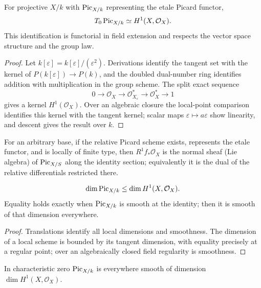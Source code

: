 \begin{theorem}\label{kps-thm-tangent}
For projective $X/k$ with $\operatorname{Pic}_{X/k}$ representing the etale Picard functor,
\[T_0\operatorname{Pic}_{X/k}\simeq H^1(X,\mathcal O_X).\]
This identification is functorial in field extension and respects the vector
space structure and the group law.
\end{theorem}
\begin{proof}
Let $k[\varepsilon]=k[\varepsilon]/(\varepsilon^2)$. Derivations identify the
tangent set with the kernel of $P(k[\varepsilon])\to P(k)$, and the doubled
dual-number ring identifies addition with multiplication in the group scheme.
The split exact sequence
\[0\to\mathcal O_X\to\mathcal O_{X_{\varepsilon}}^*\to\mathcal O_X^*\to1\]
gives a kernel $H^1(\mathcal O_X)$. Over an algebraic closure the local-point
comparison identifies this kernel with the tangent kernel; scalar maps
$\varepsilon\mapsto a\varepsilon$ show linearity, and descent gives the result
over $k$.
\end{proof}

\begin{remark}\label{kps-rmk-relative-tangent}
For an arbitrary base, if the relative Picard scheme exists, represents the
etale functor, and is locally of finite type, then $R^1f_*\mathcal O_X$ is
the normal sheaf (Lie algebra) of $\operatorname{Pic}_{X/S}$ along the identity section;
equivalently it is the dual of the relative differentials restricted there.
\end{remark}

\begin{corollary}\label{kps-cor-smooth-picard}
\[\dim\operatorname{Pic}_{X/k}\le\dim H^1(X,\mathcal O_X).\]
Equality holds exactly when $\operatorname{Pic}_{X/k}$ is smooth at the identity; then it is
smooth of that dimension everywhere.
\end{corollary}
\begin{proof}
Translations identify all local dimensions and smoothness. The dimension of a
local scheme is bounded by its tangent dimension, with equality precisely at a
regular point; over an algebraically closed field regularity is smoothness.
\end{proof}

\begin{corollary}\label{kps-cor-char-zero}
In characteristic zero $\operatorname{Pic}_{X/k}$ is everywhere smooth of dimension
$\dim H^1(X,\mathcal O_X)$.
\end{corollary}

